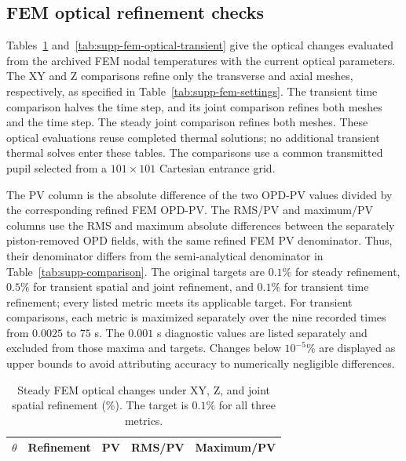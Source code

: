 \documentclass[9pt]{osa-supplemental-document}
\begin{document}
\subsection*{FEM optical refinement checks}
Tables~\ref{tab:supp-fem-optical-steady} and~\ref{tab:supp-fem-optical-transient} give the optical changes evaluated from the archived FEM nodal temperatures with the current optical parameters.
The XY and Z comparisons refine only the transverse and axial meshes, respectively, as specified in Table~\ref{tab:supp-fem-settings}.
The transient time comparison halves the time step, and its joint comparison refines both meshes and the time step.
The steady joint comparison refines both meshes.
These optical evaluations reuse completed thermal solutions; no additional transient thermal solves enter these tables.
The comparisons use a common transmitted pupil selected from a $101\times101$ Cartesian entrance grid.

The PV column is the absolute difference of the two OPD-PV values divided by the corresponding refined FEM OPD-PV.
The RMS/PV and maximum/PV columns use the RMS and maximum absolute differences between the separately piston-removed OPD fields, with the same refined FEM PV denominator.
Thus, their denominator differs from the semi-analytical denominator in Table~\ref{tab:supp-comparison}.
The original targets are $0.1\%$ for steady refinement, $0.5\%$ for transient spatial and joint refinement, and $0.1\%$ for transient time refinement; every listed metric meets its applicable target.
For transient comparisons, each metric is maximized separately over the nine recorded times from $0.0025$ to $75$ s.
The $0.001$ s diagnostic values are listed separately and excluded from those maxima and targets.
Changes below $10^{-5}\%$ are displayed as upper bounds to avoid attributing accuracy to numerically negligible differences.

\begin{table}[!htbp]\centering\small
\caption{Steady FEM optical changes under XY, Z, and joint spatial refinement (\%). The target is $0.1\%$ for all three metrics.}\label{tab:supp-fem-optical-steady}
\begin{tabular}{clrrr}\toprule
$\theta$ & Refinement & PV & RMS/PV & Maximum/PV\\\midrule

\end{tabular}
\end{table}
\end{document}
